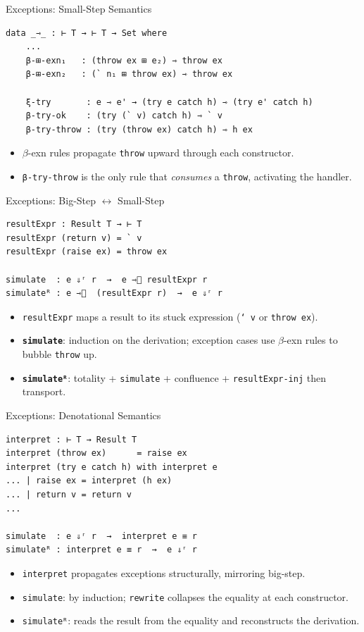 \documentclass[10pt,compress,aspectratio=169]{beamer}
\begin{document}
\begin{frame}[fragile]{Exceptions: Small-Step Semantics}
\begin{verbatim}
data _⇾_ : ⊢ T → ⊢ T → Set where
    ...
    β-⊞-exn₁   : (throw ex ⊞ e₂) ⇾ throw ex
    β-⊞-exn₂   : (` n₁ ⊞ throw ex) ⇾ throw ex
    
    ξ-try       : e ⇾ e' → (try e catch h) ⇾ (try e' catch h)
    β-try-ok    : (try (` v) catch h) ⇾ ` v
    β-try-throw : (try (throw ex) catch h) ⇾ h ex
\end{verbatim}
\begin{itemize}
    \item $\beta$-exn rules propagate \texttt{throw} upward through each constructor.
    \item \texttt{β-try-throw} is the only rule that \emph{consumes} a \texttt{throw}, activating the handler.
\end{itemize}
\end{frame}

\begin{frame}[fragile]{Exceptions: Big-Step $\leftrightarrow$ Small-Step}
\begin{verbatim}
resultExpr : Result T → ⊢ T
resultExpr (return v) = ` v
resultExpr (raise ex) = throw ex

simulate  : e ⇓ʳ r  →  e ⇾⃰ resultExpr r
simulateᴿ : e ⇾⃰  (resultExpr r)  →  e ⇓ʳ r
\end{verbatim}
\begin{itemize}
    \item \texttt{resultExpr} maps a result to its stuck expression (\texttt{` v} or \texttt{throw ex}).
    \item \textbf{\texttt{simulate}}: induction on the derivation; exception cases use $\beta$-exn rules to bubble \texttt{throw} up.
    \item \textbf{\texttt{simulateᴿ}}: totality + \texttt{simulate} + confluence + \texttt{resultExpr-inj} then transport.
\end{itemize}
\end{frame}

\begin{frame}[fragile]{Exceptions: Denotational Semantics}
\begin{verbatim}
interpret : ⊢ T → Result T
interpret (throw ex)      = raise ex
interpret (try e catch h) with interpret e
... | raise ex = interpret (h ex)
... | return v = return v
...

simulate  : e ⇓ʳ r  →  interpret e ≡ r
simulateᴿ : interpret e ≡ r  →  e ⇓ʳ r
\end{verbatim}
\begin{itemize}
    \item \texttt{interpret} propagates exceptions structurally, mirroring big-step.
    \item \texttt{simulate}: by induction; \texttt{rewrite} collapses the equality at each constructor.
    \item \texttt{simulateᴿ}: reads the result from the equality and reconstructs the derivation.
\end{itemize}
\end{frame}
\end{document}
